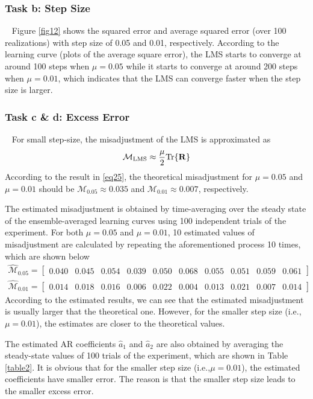 \documentclass[10pt]{article}
\begin{document}
\subsubsection{Task b: Step Size}
\ \indent
Figure \ref{fig12} shows the squared error and average squared error (over 100 realizations) with 
step size of 0.05 and 0.01, respectively. According to the learning curve (plots of the average square error),
the LMS starts to converge at around 100 steps when $\mu=0.05$ while it starts to converge at around 200 steps 
when $\mu=0.01$, which indicates that the LMS can converge faster when the step size is larger.

\subsubsection{Task c \& d: Excess Error}

\ \indent
For small step-size, the misadjustment of the LMS is approximated as
\begin{equation}
	\mathcal{M}_{\text{LMS}} \approx \frac{\mu}{2} \text{Tr}\{{\bf{R}}\} \label{eq29}
\end{equation}
According to the result in \eqref{eq25}, the theoretical misadjustment for $\mu=0.05$ 
and $\mu=0.01$ should be $\mathcal{M}_{0.05} \approx 0.035$ and $\mathcal{M}_{0.01} \approx 0.007$, 
respectively.

The estimated misadjustment is obtained by time-averaging over the steady state of the
ensemble-averaged learning curves using 100 independent trials of the experiment. For both $\mu=0.05$ and
$\mu=0.01$, 10 estimated values of misadjustment are calculated by repeating the aforementioned process 10
times, which are shown below
\begin{align}
	\hat{\mathcal{M}}_{0.05} = [\begin{matrix}
		0.040 &0.045 &0.054 &0.039 &0.050 &0.068 &0.055 &0.051 &0.059 &0.061
	\end{matrix}] \\
	\hat{\mathcal{M}}_{0.01} = [\begin{matrix}
		0.014 &0.018 &0.016 &0.006 &0.022 &0.004 &0.013 &0.021 &0.007 &0.014
	\end{matrix}]
\end{align}
According to the estimated results, we can see that the estimated misadjustment is usually larger that 
the theoretical one. However, for the smaller step size (i.e., $\mu=0.01$), the estimates are closer to
the theoretical values.

The estimated AR coefficients $\hat{a}_1$ and $\hat{a}_2$ are also obtained by averaging the steady-state values of 100
trials of the experiment, which are shown in Table \ref{table2}. It is obvious that for the smaller 
step size (i.e.,$\mu=0.01$), the estimated coefficients have smaller error. The reason is that
the smaller step size leads to the smaller excess error.
\end{document}
